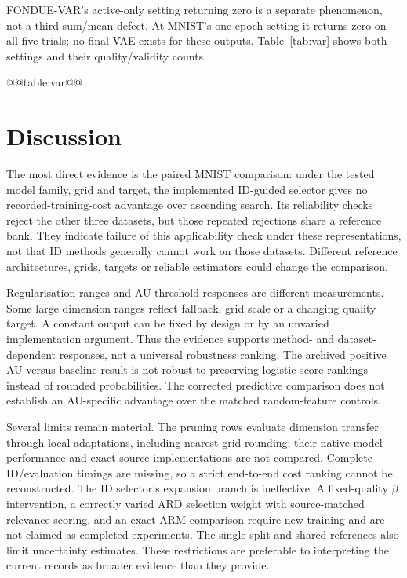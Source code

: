 FONDUE-VAR's active-only setting returning zero is a separate phenomenon,
not a third sum/mean defect. At MNIST's one-epoch setting it returns zero
on all five trials; no final VAE exists for these outputs.
Table~\ref{tab:var} shows both settings and their quality/validity counts.

@@table:var@@

\section{Discussion}\label{sec:discussion}
The most direct evidence is the paired MNIST comparison: under the tested
model family, grid and target, the implemented ID-guided selector gives
no recorded-training-cost advantage over ascending search. Its reliability
checks reject the other three datasets, but those repeated rejections
share a reference bank. They indicate failure of this applicability check
under these representations, not that ID methods generally cannot work
on those datasets. Different reference architectures, grids, targets or
reliable estimators could change the comparison.

Regularisation ranges and AU-threshold responses are different
measurements. Some large dimension ranges reflect fallback, grid scale
or a changing quality target. A constant output can be fixed by design
or by an unvaried implementation argument. Thus the evidence supports
method- and dataset-dependent responses, not a universal robustness
ranking. The archived positive AU-versus-baseline result is not robust
to preserving logistic-score rankings instead of rounded probabilities.
The corrected predictive comparison does not establish an AU-specific
advantage over the matched random-feature controls.

Several limits remain material. The pruning rows evaluate dimension
transfer through local adaptations, including nearest-grid rounding;
their native model performance and exact-source implementations are not
compared. Complete ID/evaluation timings are missing, so a strict
end-to-end cost ranking cannot be reconstructed. The ID selector's
expansion branch is ineffective. A fixed-quality $\beta$ intervention,
a correctly varied ARD selection weight with source-matched relevance
scoring, and an exact ARM comparison require new training and are not
claimed as completed experiments. The single split and shared references
also limit uncertainty estimates. These restrictions are preferable to
interpreting the current records as broader evidence than they provide.

